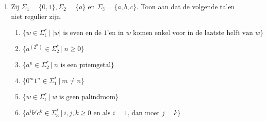 \documentclass[a4paper]{article}
\begin{document}
\begin{enumerate}
   \item Zij $\Sigma_1 = \{0,1\}, \Sigma_2 = \{a\}$ en $\Sigma_3 = \{a,b,c\}$. Toon aan dat de volgende talen niet regulier zijn.
      \begin{enumerate}
         \item $\{ w \in \Sigma_1^*\ |\ \mbox{$\left|w\right|$ is even en de $1$'en in $w$ komen enkel voor in de laatste helft van $w$}\}$   %
         \item $\{ a^{\left( 2^n \right) } \in \Sigma_2^* \ | \ n \geq 0 \}$                                      %
         \item $\{ a^n \in \Sigma_2^*\ | \ \mbox{$n$ is een priemgetal} \}$                                       %
         \item $\{ 0^m1^n \in \Sigma_1^* \ | \ m \neq n \}$                                                       %
         \item $\{ w \in \Sigma_1^* \ | \ \mbox{$w$ is geen palindroom} \}$                                       %
         \item $\{ a^ib^jc^k \in \Sigma_3^* \ | \ \mbox{$i,j,k \geq 0$ en als $i = 1$, dan moet $j=k$} \}$        %
      \end{enumerate}
	\end{enumerate}
\end{document}
